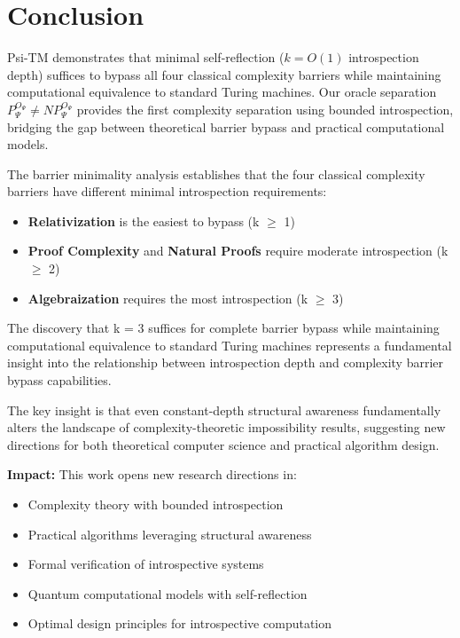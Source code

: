 \documentclass[11pt]{article}
\begin{document}
\section{Conclusion}

Psi-TM demonstrates that minimal self-reflection ($k = O(1)$ introspection depth) suffices to bypass all four classical complexity barriers while maintaining computational equivalence to standard Turing machines. Our oracle separation $P^{O_\Psi}_\Psi \neq NP^{O_\Psi}_\Psi$ provides the first complexity separation using bounded introspection, bridging the gap between theoretical barrier bypass and practical computational models.

The barrier minimality analysis establishes that the four classical complexity barriers have different minimal introspection requirements:
\begin{itemize}
\item \textbf{Relativization} is the easiest to bypass (k $\geq$ 1)
\item \textbf{Proof Complexity} and \textbf{Natural Proofs} require moderate introspection (k $\geq$ 2)
\item \textbf{Algebraization} requires the most introspection (k $\geq$ 3)
\end{itemize}

The discovery that k = 3 suffices for complete barrier bypass while maintaining computational equivalence to standard Turing machines represents a fundamental insight into the relationship between introspection depth and complexity barrier bypass capabilities.

The key insight is that even constant-depth structural awareness fundamentally alters the landscape of complexity-theoretic impossibility results, suggesting new directions for both theoretical computer science and practical algorithm design.

\textbf{Impact:} This work opens new research directions in:
\begin{itemize}
\item Complexity theory with bounded introspection
\item Practical algorithms leveraging structural awareness
\item Formal verification of introspective systems
\item Quantum computational models with self-reflection
\item Optimal design principles for introspective computation
\end{itemize}
\end{document}
